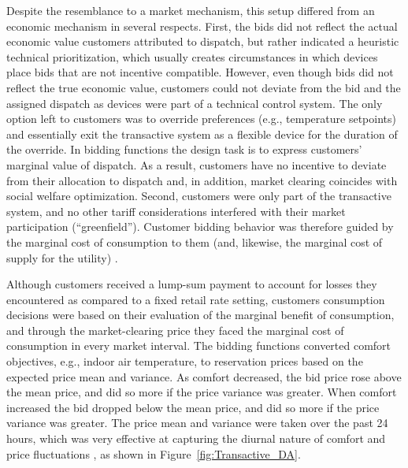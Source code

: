 Despite the resemblance to a market mechanism, this setup differed from an economic mechanism in several respects. First, the bids did not reflect the actual economic value customers attributed to dispatch, but rather indicated a heuristic technical prioritization, which usually creates circumstances in which devices place bids that are not incentive compatible. However, even though bids did not reflect the true economic value, customers could not deviate from the bid and the assigned dispatch as devices were part of a technical control system. The only option left to customers was to override preferences (e.g., temperature setpoints) and essentially exit the transactive system as a flexible device for the duration of the override. In bidding functions the design task is to express customers' marginal value of dispatch. As a result, customers have no incentive to deviate from their allocation to dispatch and, in addition, market clearing coincides with social welfare optimization. Second, customers were only part of the transactive system, and no other tariff considerations interfered with their market participation (``greenfield''). Customer bidding behavior was therefore guided by the marginal cost of consumption to them (and, likewise, the marginal cost of supply for the utility) \citep{chassin_kiesling_2008}.

Although customers received a lump-sum payment to account for losses they encountered as compared to a fixed retail rate setting, customers consumption decisions were based on their evaluation of the marginal benefit of consumption, and through the market-clearing price they faced the marginal cost of consumption in every market interval. %
The bidding functions converted comfort objectives, e.g., indoor air temperature, to reservation prices based on the expected price mean and variance. As comfort decreased, the bid price rose above the mean price, and did so more if the price variance was greater. When comfort increased the bid dropped below the mean price, and did so more if the price variance was greater.  The price mean and variance were taken over the past 24 hours, which was very effective at capturing the diurnal nature of comfort and price fluctuations , as shown in  Figure~\ref{fig:Transactive_DA}.

